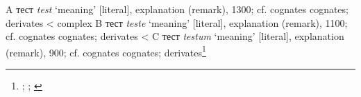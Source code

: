 \begin{etymology}\label{ety:tester}
A {тест} \textit{test} `meaning' [literal], explanation (remark), 1300; cf. cognates cognates; derivates
< complex B {тест} \textit{teste} `meaning' [literal], explanation (remark), 1100; cf. cognates cognates; derivates
< C {тест} \textit{testum} `meaning' [literal], explanation (remark), 900; cf. cognates cognates; derivates\footnote{\textcite[test1]{oed}; \textcite[test2]{oed}; \textcite[test2]{oed}}
\end{etymology}